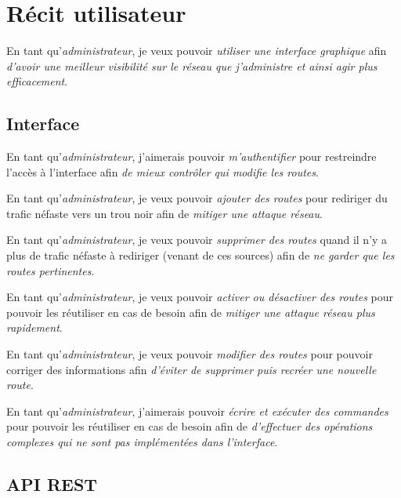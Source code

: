 \chapter{Récit utilisateur}

 En tant qu'\textit{administrateur}, je veux pouvoir \textit{utiliser une interface graphique} afin \textit{d'avoir une meilleur visibilité sur le réseau que j'administre et ainsi agir plus efficacement}.

\section{Interface}

En tant qu'\textit{administrateur}, j'aimerais pouvoir \textit{m'authentifier} pour restreindre l'accès à l'interface afin \textit{de mieux contrôler qui modifie les routes}.\bigskip

En tant qu'\textit{administrateur}, je veux pouvoir \textit{ajouter des routes} pour rediriger du trafic néfaste vers un trou noir afin de \textit{mitiger une attaque réseau}.\bigskip

En tant qu'\textit{administrateur}, je veux pouvoir \textit{supprimer des routes} quand il n'y a plus de trafic néfaste à rediriger (venant de ces sources) afin de \textit{ne garder que les routes pertinentes}.\bigskip
  
En tant qu'\textit{administrateur}, je veux pouvoir \textit{activer ou désactiver des routes} pour pouvoir les réutiliser en cas de besoin afin de \textit{mitiger une attaque réseau plus rapidement}.\bigskip

En tant qu'\textit{administrateur}, je veux pouvoir \textit{modifier des routes} pour pouvoir corriger des informations afin \textit{d'éviter de supprimer puis recréer une nouvelle route}.\bigskip

 En tant qu'\textit{administrateur}, j'aimerais pouvoir \textit{écrire et exécuter des commandes} pour pouvoir les réutiliser en cas de besoin afin de \textit{d'effectuer des opérations complexes qui ne sont pas implémentées dans l'interface}.\bigskip
 
\section{API REST}

